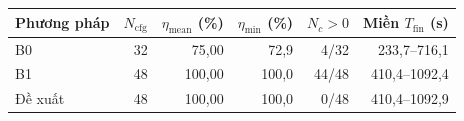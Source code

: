 \begin{tabular}{@{}lrrrrr@{}}
\toprule
Phương pháp & $N_{\mathrm{cfg}}$ & $\eta_{\mathrm{mean}}$ (\%) & $\eta_{\mathrm{min}}$ (\%) & $N_c>0$ & Miền $T_{\mathrm{fin}}$ (s) \\
\midrule
B0       & 32 & 75{,}00  & 72{,}9  & 4/32  & 233{,}7--716{,}1 \\
B1       & 48 & 100{,}00 & 100{,}0 & 44/48 & 410{,}4--1092{,}4 \\
Đề xuất  & 48 & 100{,}00 & 100{,}0 & 0/48  & 410{,}4--1092{,}9 \\
\bottomrule
\end{tabular}

